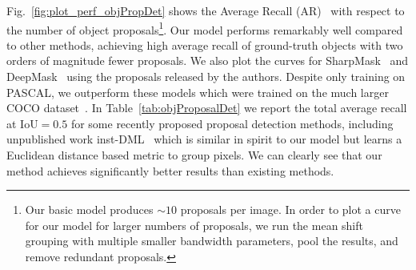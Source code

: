 \documentclass[10pt,twocolumn,letterpaper]{article}
\begin{document}

Fig.~\ref{fig:plot_perf_objPropDet} shows the Average Recall
(AR)~\cite{hosang2016makes} with respect to the number of object
proposals\footnote{Our basic model produces $\sim10$ proposals per image.  In order
to plot a curve for our model for larger numbers of proposals, we run the mean
shift grouping with multiple smaller bandwidth parameters, pool the results,
and remove redundant proposals.}. Our model performs remarkably well compared
to other methods, achieving high average recall of ground-truth objects with two
orders of magnitude fewer proposals.  We also plot the curves for
SharpMask~\cite{pinheiro2015learning} and DeepMask~\cite{pinheiro2016learning}
using the proposals released by the authors. Despite only training on PASCAL,
we outperform these models which were trained on the much larger COCO dataset~\cite{lin2014microsoft}.
In Table~\ref{tab:objProposalDet} we report the total average recall at
IoU$=0.5$ for some recently proposed proposal detection methods, including
unpublished work inst-DML~\cite{fathi2017semantic} which is similar in spirit
to our model but learns a Euclidean distance based metric to group pixels.
We can clearly see that our method achieves significantly better results than
existing methods.
\end{document}
